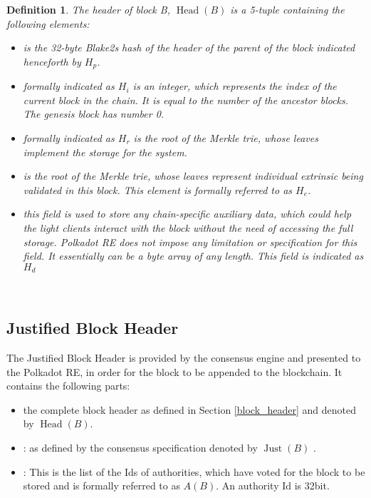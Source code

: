 \documentclass{article}
\newcommand{\tmop}[1]{\ensuremath{\operatorname{#1}}}
\newcommand{\tmstrong}[1]{\textbf{#1}}
\newcommand{\tmtextbf}[1]{{\bfseries{#1}}}
\newtheorem{definition}{Definition}
\begin{document}
\begin{definition}
  \label{def_block_header}The header of block B, $\tmop{Head} (B)$ is a
  5-tuple containing the following elements:
  \begin{itemize}
    \item \tmtextbf{{}} is the 32-byte Blake2s hash of
    the header of the parent of the block indicated henceforth by
    \tmtextbf{$H_p$}.
    
    \item {\tmstrong{{}}} formally indicated as
    {\tmstrong{$H_i$}} is an integer, which represents the index of the current block in the chain. It is equal to the number of the ancestor
    blocks. The genesis block has number 0.
    
    \item {\tmstrong{{}}} formally indicated as
    {\tmstrong{$H_r$}} is the root of the Merkle trie, whose leaves implement
    the storage for the system.
    
    \item {\tmstrong{{}}} is the root of the Merkle
    trie, whose leaves represent individual extrinsic being validated in this
    block. This element is formally referred to as {\tmstrong{$H_e$}}.
    
    \item {\tmstrong{{}}} this field is used to store any
    chain-specific auxiliary data, which could help the light clients interact
    with the block without the need of accessing the full storage. Polkadot RE
    does not impose any limitation or specification for this field. It
    essentially can be a byte array of any length. This field is indicated as
    {\tmstrong{$H_d$}}
  \end{itemize}
\end{definition}

\

\subsection{Justified Block Header}

The Justified Block Header is provided by the consensus engine and presented to
the Polkadot RE, in order for the block to be appended to the blockchain. It
contains the following parts:
\begin{itemize}
  \item {\tmstrong{{\tmsamp{{\tmstrong{block\_header}}}}}} the complete block
  header as defined in Section \ref{block_header} and denoted by $\tmop{Head}
  (B)$.
  
  \item {\tmstrong{{}}}: as defined by the
  consensus specification denoted by $\tmop{Just} (B)$ {}.
  
  \item {\tmstrong{{}}}: This is the list of the Ids of
  authorities, which have voted for the block to be stored and is formally
  referred to as $A (B)$. An authority Id is 32bit.
\end{itemize}
\end{document}
